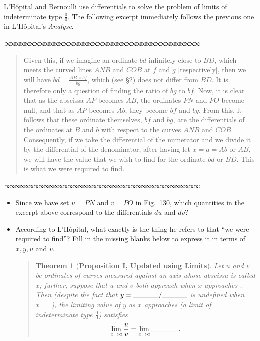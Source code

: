 \documentclass[11pt]{article}
\newtheorem*{thm*}{Theorem}
\newcommand{\sep}{\vspace{-3pt}
\begin{center}
{\mathversion{normal}
$\infty \mspace{-5.5mu}\infty \mspace{-5.5mu}\infty \mspace{-5.5mu}\infty \mspace{-5.5mu}
\infty \mspace{-5.5mu}\infty \mspace{-5.5mu}\infty \mspace{-5.5mu}\infty \mspace{-5.5mu}
\infty \mspace{-5.5mu}\infty \mspace{-5.5mu}\infty \mspace{-5.5mu}\infty \mspace{-5.5mu}
\infty \mspace{-5.5mu}\infty \mspace{-5.5mu}\infty \mspace{-5.5mu}\infty \mspace{-5.5mu}
\infty \mspace{-5.5mu}\infty \mspace{-5.5mu}\infty \mspace{-5.5mu}\infty \mspace{-5.5mu}
\infty \mspace{-5.5mu}\infty \mspace{-5.5mu}\infty \mspace{-5.5mu}\infty \mspace{-5.5mu}
\infty \mspace{-5.5mu}\infty \mspace{-5.5mu}\infty \mspace{-5.5mu}\infty \mspace{-5.5mu}
\infty \mspace{-5.5mu}\infty \mspace{-5.5mu}\infty \mspace{-5.5mu}\infty \mspace{-5.5mu}
\infty \mspace{-5.5mu}\infty \mspace{-5.5mu}\infty \mspace{-5.5mu}\infty \mspace{-5.5mu}
\infty \mspace{-5.5mu}\infty \mspace{-5.5mu}\infty \mspace{-5.5mu}\infty \mspace{-5.5mu}$}
\end{center} \vspace*{-5pt}}
\newenvironment{source}%
 {\bigskip \sep \vspace*{-6pt} \begin{quote}
          \begin{sf}   }
   {   \end{sf}     \end{quote} \vspace*{-6pt} \sep \bigskip}%
\newcounter{tasknumb}
\newcommand{\tasknumb}[1]{\refstepcounter{tasknumb}\textmd{\textbf{$\fbox{$\fbox{Task \thetasknumb}$}$}}#1}
\newenvironment{task}[1][]%
 {\begin{itemize}
 \item[\tasknumb{#1}] }
{
    \end{itemize}    }%
\begin{document}
\bigskip
L'H\^opital and Bernoulli use differentials to solve the problem of limits of indeterminate type $\frac00$. The following excerpt immediately follows the previous one in L'H\^opital's \emph{Analyse}.
 
\bigskip
\begin{source}

Given this, if we imagine an ordinate $bd$ infinitely close to $BD$, which meets the curved lines $ANB$ and $COB$ at $f$ and $g$ [respectively], then we will have $bd=\frac{AB \times bf}{bg}$, which (see \S2) does not differ from $BD$. It is therefore only a question of finding the ratio of $bg$ to $bf$. Now, it is clear that as the abscissa $AP$ becomes $AB$, the ordinates $PN$ and $PO$ become null, and that as $AP$ becomes $Ab$, they become $bf$ and $bg$. From this, it follows that these ordinate themselves, $bf$ and $bg$, are the differentials of the ordinates at $B$ and $b$ with respect to the curves $ANB$ and $COB$. Consequently, if we take the differential of the numerator and we divide it by the differential of the denominator, after having let $x=a=Ab$ or $AB$, we will have the value that we wish to find for the ordinate $bd$ or $BD$. This is what we were required to find.

\end{source}

\begin{task}[\label{uv}]
Since we have set $u=PN$ and $v=PO$ in Fig.~130, which quantities in the excerpt above correspond to the differentials $du$ and $dv$?
\end{task}

\begin{task}[\label{updated}]
According to L'H\^opital, what exactly is the thing he refers to that ``we were required to find''? Fill in the missing blanks below to express it in terms of $x, y, u$ and $v$.
\begin{quote}
\begin{thm*}[{\bf Proposition I, Updated using Limits}]
Let $u$ and $v$ be ordinates of curves measured against an axis whose abscissa is called $x$; further, suppose that $u$ and $v$ both approach \makebox[0.5in]{\hrulefill} when $x$ approaches \makebox[0.5in]{\hrulefill}. Then (despite the fact that $y=\makebox[0.5in]{\hrulefill}/\makebox[0.5in]{\hrulefill}$ is undefined when $x=$ \makebox[0.5in]{\hrulefill}), the limiting value of $y$ as $x$ approaches \makebox[0.5in]{\hrulefill} (a limit of indeterminate type ${\displaystyle \frac00}$) satisfies
	\begin{equation}\label{OldRule}
	\lim_{x\to a} \frac{u}{v}=\lim_{x\to a} \makebox[0.5in]{\hrulefill}\;.
	\end{equation}
\end{thm*}
\end{quote}
\end{task}
\end{document}
